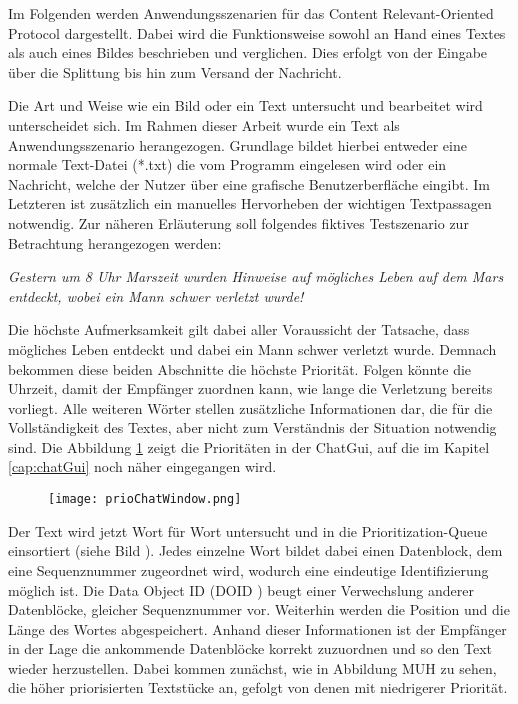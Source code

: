 \label{sec:Anwendungsszenarien}

Im Folgenden werden Anwendungsszenarien für das Content
Relevant-Oriented Protocol dargestellt. Dabei wird die Funktionsweise sowohl an
Hand eines Textes als auch eines Bildes beschrieben und verglichen. Dies erfolgt
von der Eingabe über die Splittung bis hin zum Versand der Nachricht. 

Die Art und Weise wie ein Bild oder ein Text untersucht und bearbeitet wird
unterscheidet sich. Im Rahmen dieser Arbeit wurde ein Text als
Anwendungsszenario herangezogen. Grundlage bildet hierbei entweder eine
normale Text-Datei (*.txt)  die vom Programm
eingelesen wird oder ein Nachricht, welche der Nutzer über eine grafische
Benutzerberfläche eingibt.
Im Letzteren ist zusätzlich ein manuelles Hervorheben der wichtigen Textpassagen
notwendig. Zur näheren Erläuterung soll folgendes fiktives Testszenario zur
Betrachtung herangezogen werden:

\textit{\glqq Gestern um 8 Uhr Marszeit wurden Hinweise auf mögliches Leben auf
dem Mars entdeckt, wobei ein Mann schwer verletzt wurde! \grqq}

Die höchste Aufmerksamkeit gilt dabei aller Voraussicht der Tatsache, dass
mögliches Leben entdeckt und dabei ein Mann schwer verletzt wurde. Demnach
bekommen diese beiden Abschnitte die höchste Priorität. Folgen könnte die
Uhrzeit, damit der Empfänger zuordnen kann, wie lange die Verletzung bereits
vorliegt. Alle weiteren Wörter stellen zusätzliche Informationen dar, die für
die Vollständigkeit des Textes, aber nicht zum Verständnis der Situation notwendig
sind. Die Abbildung \ref{fig:prioChatWindow} zeigt die Prioritäten in der
ChatGui, auf die im Kapitel \ref{cap:chatGui} noch näher eingegangen wird.

\begin{figure}[H]
	\centering
	\texttt{[image: prioChatWindow.png]}
	\label{fig:prioChatWindow}
\end{figure}

Der Text wird jetzt Wort für Wort untersucht und in die
Prioritization-Queue einsortiert (siehe Bild ). Jedes einzelne Wort  bildet dabei einen
Datenblock, dem eine Sequenznummer zugeordnet wird, wodurch eine eindeutige
Identifizierung möglich ist. Die Data Object ID (DOID ) beugt einer Verwechslung anderer
Datenblöcke, gleicher Sequenznummer vor. Weiterhin werden die Position und die
Länge des Wortes abgespeichert. Anhand dieser Informationen ist der Empfänger in
der Lage die ankommende Datenblöcke korrekt zuzuordnen und so den Text wieder herzustellen.
Dabei kommen zunächst, wie in Abbildung MUH  zu sehen, die höher priorisierten Textstücke an, gefolgt
von denen mit niedrigerer Priorität.

